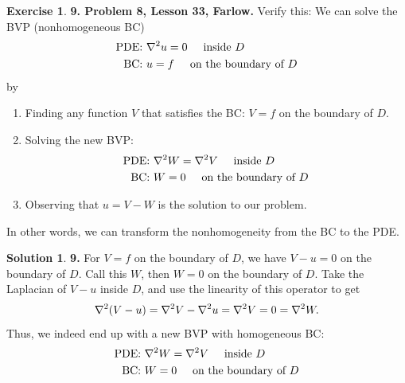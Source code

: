 \documentclass{article}
\theoremstyle{definition}
\newtheorem*{exer*}{Exercise}
\newtheorem*{sln*}{Solution}
\begin{document}
\begin{exer*}\textbf{9. Problem 8, Lesson 33, Farlow.} Verify this: We can solve the BVP (nonhomogeneous BC)
	\begin{align*}
	\text{PDE: }& \laplacian u  = 0 \hspace{0.5cm} \text{inside }D\\
	\text{BC: } & u =f \hspace{0.5cm} \text{on the boundary of }D
	\end{align*}
	by 
	\begin{enumerate}
		\item Finding any function $V$ that satisfies the BC: $V = f$ on the boundary of $D$. 
		\item Solving the new BVP:
		\begin{align*}
		\text{PDE: }& \laplacian W  = \laplacian V \hspace{0.5cm} \text{inside }D\\
		\text{BC: } & W = 0 \hspace{0.5cm} \text{on the boundary of }D
		\end{align*}
		\item Observing that $u = V - W$ is the solution to our problem. 
	\end{enumerate}
	In other words, we can transform the nonhomogeneity from the BC to the PDE.
	
	\begin{sln*}\textbf{9.} 
		For $V = f$ on the boundary of $D$, we have $V - u = 0$ on the boundary of $D$. Call this $W$, then $W = 0$ on the boundary of $D$. Take the Laplacian of $V-u$ inside $D$, and use the linearity of this operator to get
		\begin{align*}
		\laplacian (V-u) = \laplacian V - \laplacian u = \laplacian V =  0 = \laplacian W.
		\end{align*}
		Thus, we indeed end up with a new BVP with homogeneous BC:
		\begin{align*}
		\text{PDE: }& \laplacian W  = \laplacian V \hspace{0.5cm} \text{inside }D\\
		\text{BC: } & W = 0 \hspace{0.5cm} \text{on the boundary of }D
		\end{align*}
	\end{sln*}
\end{exer*}




\newpage
\end{document}
